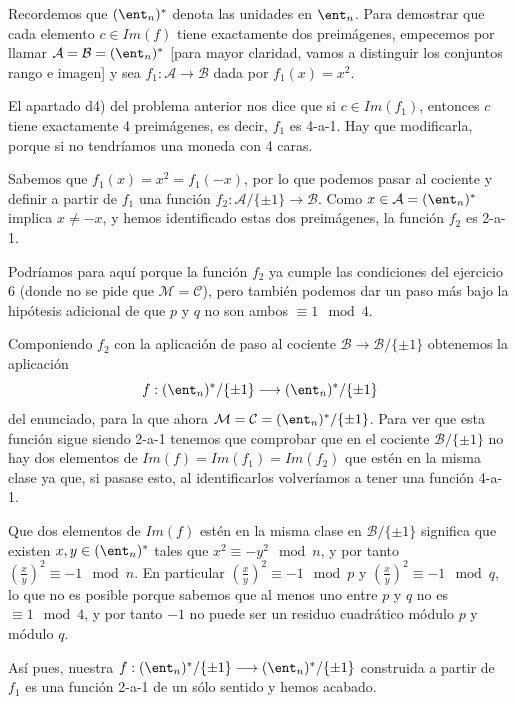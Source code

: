 \begin{problem}[8]
\begin{itemize}
\end{itemize}

Recordemos que $(\ent_n)^*$ denota las unidades en $\ent_n$. Para demostrar que cada elemento $c\in Im(f)$ tiene exactamente dos preimágenes, empecemos por llamar $\mathcal A=\mathcal B=(\ent_n)^*$ [para mayor claridad, vamos a distinguir los conjuntos rango e imagen] y sea $f_1:\mathcal A\longrightarrow \mathcal B$ dada por $f_1(x)=x^2$.

El apartado d4) del problema anterior nos dice que si $c\in Im(f_1)$, entonces $c$ tiene exactamente 4 preimágenes, es decir, $f_1$ es 4-a-1. Hay que modificarla, porque si no tendríamos una moneda con 4 caras.

Sabemos que $f_1(x)=x^2=f_1(-x)$, por lo que podemos pasar al cociente y definir a partir de $f_1$ una función $f_2:\mathcal A/\{\pm1\}\longrightarrow \mathcal B$. Como $x\in \mathcal A=(\ent_n)^*$ implica $x\neq -x$, y hemos identificado estas dos preimágenes, la función $f_2$ es 2-a-1.

Podríamos para aquí porque la función $f_2$ ya cumple las condiciones del ejercicio 6 (donde no se pide que $\mathcal M=\mathcal C$), pero también podemos dar un paso más bajo la hipótesis adicional de que $p$ y $q$ no son ambos $\equiv 1 \mod 4$.

Componiendo $f_2$ con la aplicación de paso al cociente $\mathcal B \longrightarrow \mathcal B/\{\pm 1\}$ obtenemos la aplicación $$f: (\ent_n)^*/\{\pm 1\} \longrightarrow (\ent_n)^*/\{\pm 1\}$$ del enunciado, para la que ahora $\mathcal M=\mathcal C=(\ent_n)^*/\{\pm 1\}$. Para ver que esta función sigue siendo 2-a-1 tenemos que comprobar que en el cociente $\mathcal B /\{\pm 1\}$ no hay dos elementos de $Im(f)=Im(f_1)=Im(f_2)$ que estén en la misma clase ya que, si pasase esto, al identificarlos volveríamos a tener una función 4-a-1.

Que dos elementos de $Im(f)$ estén en la misma clase en $\mathcal B /\{\pm 1\}$ significa que existen $x,y\in(\ent_n)^*$ tales que $x^2\equiv -y^2 \mod n$, y por tanto $(\frac{x}{y})^2\equiv -1 \mod n$. En particular $(\frac{x}{y})^2\equiv -1 \mod p$ y $(\frac{x}{y})^2\equiv -1 \mod q$, lo que no es posible porque sabemos que al menos uno entre $p$ y $q$ no es $\equiv 1 \mod 4$, y por tanto $-1$ no puede ser un residuo cuadrático módulo $p$ y módulo $q$.

Así pues, nuestra $f: (\ent_n)^*/\{\pm 1\} \longrightarrow (\ent_n)^*/\{\pm 1\}$ construida a partir de $f_1$ es una función 2-a-1 de un sólo sentido y hemos acabado.

\end{problem}

